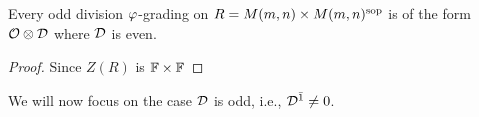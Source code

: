 

\begin{thm}
	Every odd division $\varphi$-grading on $R = M(m,n)\times M(m,n)^{\mathrm{sop}}$ is of the form $\mathcal O \otimes \mathcal{D}$ where $\mathcal{D}$ is even.
\end{thm}

\begin{proof}
	Since $Z(R)$ is $\mathbb{F} \times \mathbb{F}$
\end{proof}

We will now focus on the case $\mathcal{D}$ is odd, i.e., $\mathcal{D}^{\bar1} \neq 0$.

